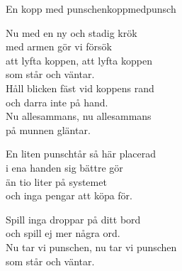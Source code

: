 \begin{song}{En kopp med punsch}{enkoppmedpunsch}
\begin{vers}
Nu med en ny och stadig krök\\
med armen gör vi försök\\
att lyfta koppen, att lyfta koppen\\
som står och väntar.\\
Håll blicken fäst vid koppens rand\\
och darra inte på hand.\\
Nu allesammans, nu allesammans\\
på munnen gläntar.\\
\end{vers}
\begin{vers}
En liten punschtår så här placerad\\
i ena handen sig bättre gör\\
än tio liter på systemet\\
och inga pengar att köpa för.\\
\end{vers}
\begin{vers}
Spill inga droppar på ditt bord\\
och spill ej mer några ord.\\
Nu tar vi punschen, nu tar vi punschen\\
som står och väntar.\\
\end{vers}
\end{song}
